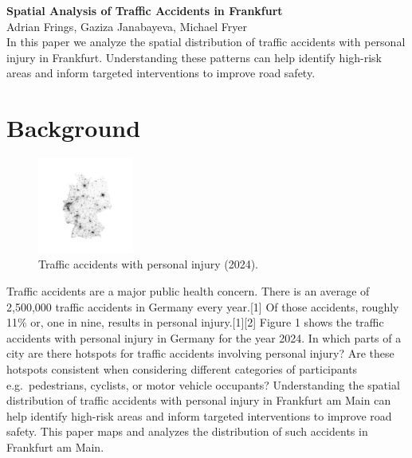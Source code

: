 \documentclass[10pt,a4paper]{article} %
\begin{document}
\begin{center}
    {\large\bfseries Spatial Analysis of Traffic Accidents in Frankfurt}\\[0.5em]
    {\small Adrian Frings, Gaziza Janabayeva, Michael Fryer}\\[1em]
    {\small In this paper we analyze the spatial distribution of traffic accidents with personal injury in Frankfurt. Understanding these patterns can help identify high-risk areas and inform targeted interventions to improve road safety.}
\end{center}

\section*{Background}
\begin{figure}
    \centering
    \vspace{0pt}
    \includegraphics[width=0.28\textwidth]{../src/img/de-2024-bw.png}
    \caption{Traffic accidents with personal injury (2024).}
    \vspace{-30pt}
\end{figure}

Traffic accidents are a major public health concern. There is an average of 2,500,000 traffic accidents in Germany every year.[1] Of those accidents, roughly 11\% or, one in nine, results in personal injury.[1][2] Figure 1 shows the traffic accidents with personal injury in Germany for the year 2024. In which parts of a city are there hotspots for traffic accidents involving personal injury? Are these hotspots consistent when considering different categories of participants e.g.\ pedestrians, cyclists, or motor vehicle occupants? Understanding the spatial distribution of traffic accidents with personal injury in Frankfurt am Main can help identify high-risk areas and inform targeted interventions to improve road safety. This paper maps and analyzes the distribution of such accidents in Frankfurt am Main.
\end{document}

